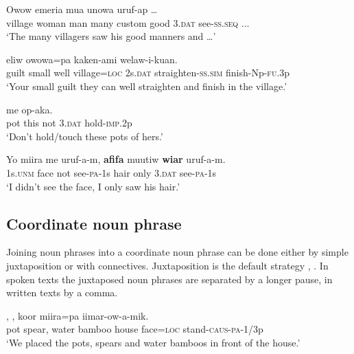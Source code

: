 \ea%
\label{ex:4:x1793}
\gll Owow  emeria  mua  unowa       uruf-ap  {\dots} \\
  village  woman  man  many  custom  good  3.\textsc{dat}  see-\textsc{ss}.\textsc{seq}  ...    \\
\glt`The many villagers saw his good manners and {\dots}'
\z

\ea%
\label{ex:4:x1811}
\gll {}    eliw  owowa=pa    kaken-ami  welaw-i-kuan.\\
  guilt  small  well  village=\textsc{loc}  2s.\textsc{dat}  straighten-\textsc{ss}.\textsc{sim}  finish-Np-\textsc{fu}.3p    \\
\glt`Your small guilt they can well straighten and finish in the village.'
\z

\ea%
\label{ex:4:x1812}
\gll {}   me    op-aka. \\
 pot  this  not  3.\textsc{dat}  hold-\textsc{imp}.2p     \\
\glt`Don't hold/touch these pots of hers.'
\z

\ea%
\label{ex:4:x1938}
\gll Yo  miira  me  uruf-a-m,  \textbf{afifa}  muutiw  \textbf{wiar}  uruf-a-m. \\
   1s.\textsc{unm}  face  not  see-\textsc{pa}-1s  hair  only  3.\textsc{dat}  see-\textsc{pa}-1s   \\
\glt`I didn't see the face, I only saw his hair.'
\z

\subsection{Coordinate noun phrase} \label{sec:4.1.2}
{}
Joining noun phrases into a coordinate noun phrase can be done either by simple juxtaposition or with connectives. Juxtaposition is the default strategy , .  In spoken texts the juxtaposed noun phrases are separated by a longer pause, in written texts by a comma.

\ea%
\label{ex:4:x810}
\gll {},  ,     koor  miira=pa  iimar-ow-a-mik. \\
  pot  spear,  water  bamboo  house  face=\textsc{loc}  stand-\textsc{caus}-\textsc{pa}-1/3p    \\
\glt`We placed the pots, spears and water bamboos in front of the house.'
\z

